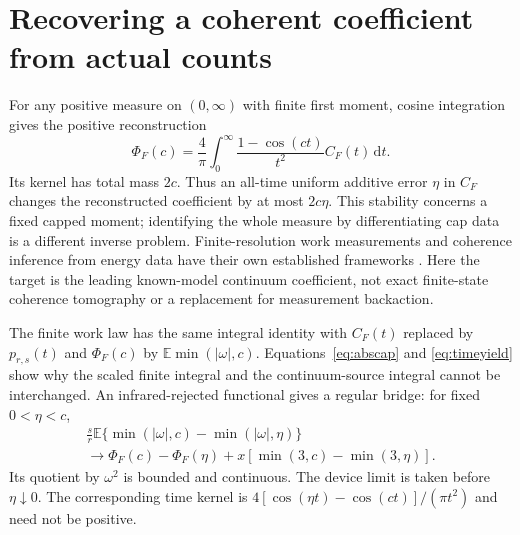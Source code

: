 \documentclass[aps,pra,reprint,superscriptaddress,longbibliography]{revtex4-2}
\newcommand{\dd}{\mathrm d}
\begin{document}
\section{Recovering a coherent coefficient from actual counts}
\label{sec:counts}

For any positive measure on $(0,\infty)$ with finite first moment,
cosine integration gives the positive reconstruction
\begin{equation}
 \Phi_F(c)=\frac4\pi\int_0^\infty
              \frac{1-\cos(ct)}{t^2}C_F(t)\,\dd t.            \label{eq:positive}
\end{equation}
Its kernel has total mass $2c$. Thus an all-time uniform additive
error $\eta$ in $C_F$ changes the reconstructed coefficient by at
most $2c\eta$. This stability concerns a fixed capped moment;
identifying the whole measure by differentiating cap data is a
different inverse problem. Finite-resolution work measurements and
coherence inference from energy data have their own established
frameworks \cite{Ahmad2022,Alonso2026}. Here the target is the leading
known-model continuum coefficient, not exact finite-state coherence
tomography or a replacement for measurement backaction.

The finite work law has the same integral identity with
$C_F(t)$ replaced by $p_{r,s}(t)$ and $\Phi_F(c)$ by
$\mathbb E\min(|\omega|,c)$. Equations~\eqref{eq:abscap} and
\eqref{eq:timeyield} show why the scaled finite integral and the
continuum-source integral cannot be interchanged. An infrared-rejected
functional gives a regular bridge: for fixed $0<\eta<c$,
\begin{align}
 \frac s r\mathbb E\{\min(|\omega|,c)-\min(|\omega|,\eta)\}
 \nonumber\\
 \longrightarrow\Phi_F(c)-\Phi_F(\eta)
             +x[\min(3,c)-\min(3,\eta)].                    \label{eq:reject}
\end{align}
Its quotient by $\omega^2$ is bounded and continuous. The device limit
is taken before $\eta\downarrow0$. The corresponding time kernel is
$4[\cos(\eta t)-\cos(ct)]/(\pi t^2)$ and need not be positive.
\end{document}
